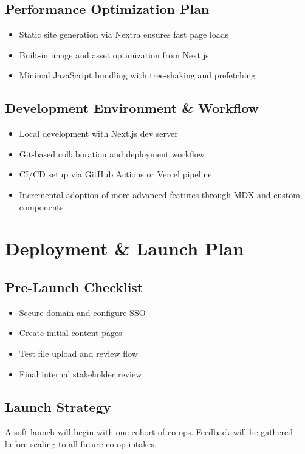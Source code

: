 \documentclass[11pt,a4paper]{article}
\begin{document}
  \subsection{Performance Optimization Plan}
    \begin{itemize}
      \item Static site generation via Nextra ensures fast page loads
      \item Built-in image and asset optimization from Next.js
      \item Minimal JavaScript bundling with tree-shaking and prefetching
    \end{itemize}

  \subsection{Development Environment \& Workflow}
    \begin{itemize}
      \item Local development with Next.js dev server
      \item Git-based collaboration and deployment workflow
      \item CI/CD setup via GitHub Actions or Vercel pipeline
      \item Incremental adoption of more advanced features through MDX and custom components
    \end{itemize}


\section{Deployment \& Launch Plan}

\subsection{Pre-Launch Checklist}
\begin{itemize}
  \item Secure domain and configure SSO
  \item Create initial content pages
  \item Test file upload and review flow
  \item Final internal stakeholder review
\end{itemize}

\subsection{Launch Strategy}
A soft launch will begin with one cohort of co-ops. Feedback will be gathered before scaling to all future co-op intakes.
\end{document}

